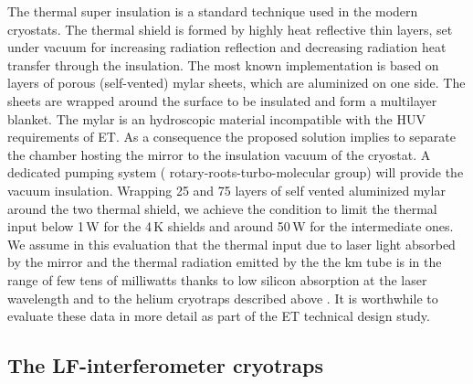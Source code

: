 The thermal super insulation is a standard technique used in the modern cryostats. The thermal shield is formed by highly heat reflective thin layers, set under vacuum for increasing radiation reflection and decreasing radiation heat transfer through the insulation. The most known implementation is based on layers of porous (self-vented) mylar sheets, which are aluminized on one side. The sheets are wrapped around the surface to be insulated and form a multilayer blanket. The mylar is an hydroscopic material incompatible with the HUV requirements of ET. As a consequence the proposed solution implies to separate the chamber hosting the mirror to the insulation vacuum of the cryostat. A dedicated pumping system ( rotary-roots-turbo-molecular group) will provide the vacuum insulation. Wrapping 25 and 75 layers of self vented aluminized mylar around the two thermal shield, we achieve the condition to limit the thermal input below 1\,W for the 4\,K shields and around 50\,W for the intermediate ones. We assume in this evaluation that the thermal input due to laser light absorbed by the mirror and the thermal radiation emitted by the the km tube is in the range of few tens of milliwatts thanks to low silicon absorption at the laser wavelength and to the helium cryotraps described above
. It is worthwhile to evaluate these data in more detail as part of the ET technical design study.  

\subsection{The LF-interferometer cryotraps}

